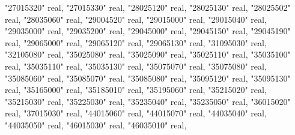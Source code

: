\documentclass[12pt,oneside]{reedthesis}
\newenvironment{Shaded}{\begin{snugshade}}{\end{snugshade}}
\newcommand{\DataTypeTok}[1]{\textcolor[rgb]{0.13,0.29,0.53}{#1}}
\newcommand{\NormalTok}[1]{#1}
\newcommand{\OtherTok}[1]{\textcolor[rgb]{0.56,0.35,0.01}{#1}}
\begin{document}
\begin{Shaded}
\begin{Highlighting}[]
     \OtherTok{"27015320"} \DataTypeTok{real}\NormalTok{, }\OtherTok{"27015330"} \DataTypeTok{real}\NormalTok{, }\OtherTok{"28025120"} \DataTypeTok{real}\NormalTok{, }\OtherTok{"28025130"} \DataTypeTok{real}\NormalTok{, }\OtherTok{"28025502"} \DataTypeTok{real}\NormalTok{, }\OtherTok{"28035060"} \DataTypeTok{real}\NormalTok{, }
     \OtherTok{"29004520"} \DataTypeTok{real}\NormalTok{, }\OtherTok{"29015000"} \DataTypeTok{real}\NormalTok{, }\OtherTok{"29015040"} \DataTypeTok{real}\NormalTok{, }\OtherTok{"29035000"} \DataTypeTok{real}\NormalTok{, }\OtherTok{"29035200"} \DataTypeTok{real}\NormalTok{, }\OtherTok{"29045000"} \DataTypeTok{real}\NormalTok{, }
     \OtherTok{"29045150"} \DataTypeTok{real}\NormalTok{, }\OtherTok{"29045190"} \DataTypeTok{real}\NormalTok{, }\OtherTok{"29065000"} \DataTypeTok{real}\NormalTok{, }\OtherTok{"29065120"} \DataTypeTok{real}\NormalTok{, }\OtherTok{"29065130"} \DataTypeTok{real}\NormalTok{, }\OtherTok{"31095030"} \DataTypeTok{real}\NormalTok{, }
     \OtherTok{"32105080"} \DataTypeTok{real}\NormalTok{, }\OtherTok{"35025080"} \DataTypeTok{real}\NormalTok{, }\OtherTok{"35025090"} \DataTypeTok{real}\NormalTok{, }\OtherTok{"35025110"} \DataTypeTok{real}\NormalTok{, }\OtherTok{"35035100"} \DataTypeTok{real}\NormalTok{, }\OtherTok{"35035110"} \DataTypeTok{real}\NormalTok{, }
     \OtherTok{"35035130"} \DataTypeTok{real}\NormalTok{, }\OtherTok{"35075070"} \DataTypeTok{real}\NormalTok{, }\OtherTok{"35075080"} \DataTypeTok{real}\NormalTok{, }\OtherTok{"35085060"} \DataTypeTok{real}\NormalTok{, }\OtherTok{"35085070"} \DataTypeTok{real}\NormalTok{, }\OtherTok{"35085080"} \DataTypeTok{real}\NormalTok{, }
     \OtherTok{"35095120"} \DataTypeTok{real}\NormalTok{, }\OtherTok{"35095130"} \DataTypeTok{real}\NormalTok{, }\OtherTok{"35165000"} \DataTypeTok{real}\NormalTok{, }\OtherTok{"35185010"} \DataTypeTok{real}\NormalTok{, }\OtherTok{"35195060"} \DataTypeTok{real}\NormalTok{, }\OtherTok{"35215020"} \DataTypeTok{real}\NormalTok{, }
     \OtherTok{"35215030"} \DataTypeTok{real}\NormalTok{, }\OtherTok{"35225030"} \DataTypeTok{real}\NormalTok{, }\OtherTok{"35235040"} \DataTypeTok{real}\NormalTok{, }\OtherTok{"35235050"} \DataTypeTok{real}\NormalTok{, }\OtherTok{"36015020"} \DataTypeTok{real}\NormalTok{, }\OtherTok{"37015030"} \DataTypeTok{real}\NormalTok{, }
     \OtherTok{"44015060"} \DataTypeTok{real}\NormalTok{, }\OtherTok{"44015070"} \DataTypeTok{real}\NormalTok{, }\OtherTok{"44035040"} \DataTypeTok{real}\NormalTok{, }\OtherTok{"44035050"} \DataTypeTok{real}\NormalTok{, }\OtherTok{"46015030"} \DataTypeTok{real}\NormalTok{, }\OtherTok{"46035010"} \DataTypeTok{real}\NormalTok{, }

\end{Highlighting}
\end{Shaded}
\end{document}
